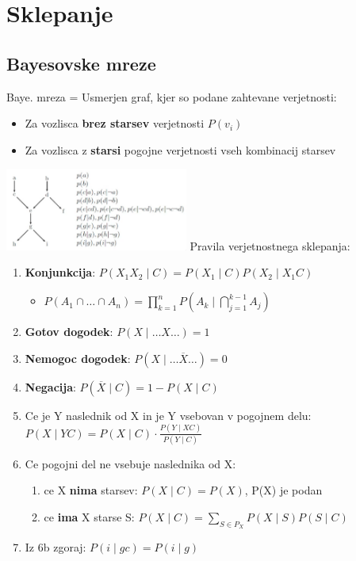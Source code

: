 \section{Sklepanje}
\subsection{Bayesovske mreze}
Baye. mreza = Usmerjen graf, kjer so podane zahtevane verjetnosti:
\begin{itemize}[leftmargin=*,topsep=0pt,noitemsep]
    \item Za vozlisca \textbf{brez starsev} verjetnosti $P(v_i)$
    \item Za vozlisca z \textbf{starsi} pogojne verjetnosti vseh kombinacij starsev
\end{itemize}
\includegraphics[width=6cm]{images/bayesovska_mreza.png}
Pravila verjetnostnega sklepanja:
\begin{enumerate}[leftmargin=*,topsep=0pt,noitemsep]
    \item \textbf{Konjunkcija}: $P(X_1 X_2 \mid C) = P(X_1 \mid C) P(X_2 \mid X_1C)$
        \begin{itemize}[leftmargin=*,topsep=0pt,noitemsep]
            \item $P(A_1\cap\dots\cap A_n) = \prod\limits_{k=1}^n P\left(A_k\mid \bigcap\limits_{j=1}^{k-1} A_j\right)$ 
        \end{itemize} 
    \item \textbf{Gotov dogodek}: $P(X \mid \dots X \dots) = 1$
    \item \textbf{Nemogoc dogodek}: $P(X\mid \dots \overline{X} \dots) = 0$
    \item \textbf{Negacija}: $P(\overline{X} \mid C) = 1 - P(X \mid C)$
    \item Ce je Y naslednik od X in je Y vsebovan v pogojnem delu: $P(X\mid YC) = P(X\mid C) \cdot \frac{P(Y\mid XC)}{P(Y\mid C)}$
    \item Ce pogojni del ne vsebuje naslednika od X:
        \begin{enumerate}[leftmargin=0.1cm,noitemsep,topsep=0pt,label=(\alph*)]
            \item ce X \textbf{nima} starsev: $P(X\mid C) = P(X)$, P(X) je podan
            \item ce \textbf{ima} X starse S: $P(X\mid C) = \sum_{S\in P_X} P(X \mid S)P(S\mid C)$
        \end{enumerate}
    \item Iz 6b zgoraj: $P(i \mid gc) = P(i \mid g)$
\end{enumerate}

